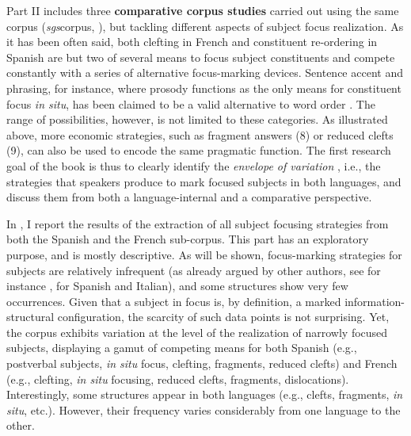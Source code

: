 Part II includes three \textbf{comparative corpus studies} carried out using the same corpus (\textit{sgs}corpus, \cite{adli2011gradient}), but tackling different aspects of subject focus realization. As it has been often said, both clefting in French and constituent re-ordering in Spanish are but two of several means to focus subject constituents and compete constantly with a series of alternative focus-marking devices. Sentence accent and phrasing, for instance, where prosody functions as the only means for constituent focus \textit{in situ}, has been claimed to be a valid alternative to word order \parencite{dufter2009focus}. 
The range of possibilities, however, is not limited to these categories. As illustrated above, more economic strategies, such as fragment answers (8) or reduced clefts (9), can also be used to encode the same pragmatic function. The first research goal of the book is thus to clearly identify the \textit{envelope of variation} \parencite{labov1972sociolinguistic}, i.e., the strategies that speakers produce to mark focused subjects in both languages, and discuss them from both a language-internal and a comparative perspective. 

In \textsc{}, I report the results of the extraction of all subject focusing strategies from both the Spanish and the French sub-corpus. This part has an exploratory purpose, and is mostly descriptive. As will be shown, focus-marking strategies for subjects are relatively infrequent (as already argued by other authors, see for instance \cite{brunetti2009italian}, for Spanish and Italian), and some structures show very few occurrences. Given that a subject in focus is, by definition, a marked information-structural configuration, the scarcity of such data points is not surprising. Yet, the corpus exhibits variation at the level of the realization of narrowly focused subjects, displaying a gamut of competing means for both Spanish (e.g., postverbal subjects, \textit{in situ} focus, clefting, fragments, reduced clefts) and French (e.g., clefting, \textit{in situ} focusing, reduced clefts, fragments, dislocations). Interestingly, some structures appear in both languages (e.g., clefts, fragments, \textit{in situ}, etc.). However, their frequency varies considerably from one language to the other.

